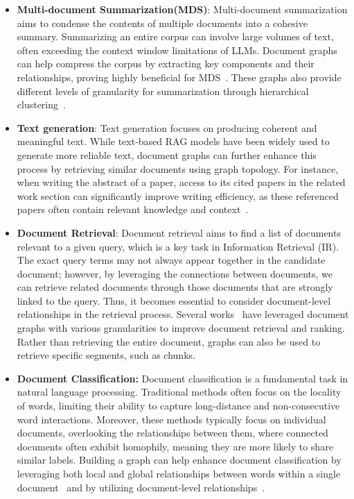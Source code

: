 \begin{itemize}[leftmargin=*]
\item \textbf{Multi-document Summarization(MDS)}: Multi-document summarization aims to condense the contents of multiple documents into a cohesive summary. Summarizing an entire corpus can involve large volumes of text, often exceeding the context window limitations of LLMs. Document graphs can help compress the corpus by extracting key components and their relationships, proving highly beneficial for MDS~\citep{yasunaga2017graph, wang2020heterogeneous, li2020leveraging, zhang2023contrastive, xie2022gretel, zhang2023enhancing, yang2018integrated, li2023compressed, chen2021sgsum}. These graphs also provide different levels of granularity for summarization through hierarchical clustering~\citep{edge2024local}.


\item \textbf{Text generation}: Text generation focuses on producing coherent and meaningful text. While text-based RAG models have been widely used to generate more reliable text, document graphs can further enhance this process by retrieving similar documents using graph topology. For instance, when writing the abstract of a paper, access to its cited papers in the related work section can significantly improve writing efficiency, as these referenced papers often contain relevant knowledge and context~\citep{wang2024augmenting, pan2020semantic}.
 
\item \textbf{Document Retrieval}: Document retrieval aims to find a list of documents relevant to a given query, which is a key task in Information Retrieval (IR). The exact query terms may not always appear together in the candidate document; however, by leveraging the connections between documents, we can retrieve related documents through those documents that are strongly linked to the query. Thus, it becomes essential to consider document-level relationships in the retrieval process. Several works~\citep{dong2024don, yu2021graph, zhang2018graph, liu2018matching} have leveraged document graphs with various granularities to improve document retrieval and ranking. Rather than retrieving the entire document, graphs can also be used to retrieve specific segments, such as chunks. 


\item \textbf{Document Classification:} Document classification is a fundamental task in natural language processing. Traditional methods often focus on the locality of words, limiting their ability to capture long-distance and non-consecutive word interactions. Moreover, these methods typically focus on individual documents, overlooking the relationships between them, where connected documents often exhibit homophily, meaning they are more likely to share similar labels. Building a graph can help enhance document classification by leveraging both local and global relationships between words within a single document~\citep{zhang2020every, liu2022hierarchical} and by utilizing document-level relationships~\citep{zhang2020text, xiao2022graph}.


\end{itemize}
